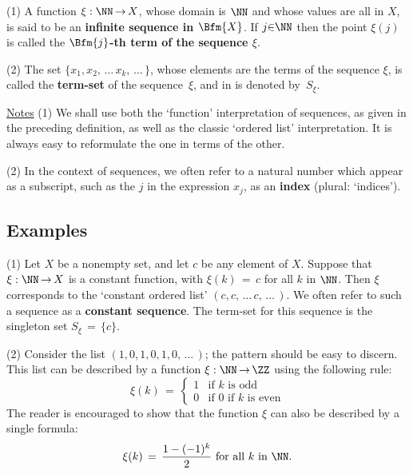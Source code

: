         (1) A function ${\xi}:{\NN} \,{\rightarrow}\, X$, whose domain is ${\NN}$ and whose values are all in $X$,
    is said to be an {\bf infinite sequence in $\Bfm{X}$}.
    If $j{\in}{\NN}$ then the point ${\xi}(j)$ is called the {\bf $\Bfm{j}$-th term of the sequence ${\xi}$}.

\V

        (2) The set $\{x_{1}, x_{2},\,{\ldots}\,x_{k},\,{\ldots}\,\}$, whose elements are the terms of the sequence ${\xi}$,
    is called the {\bf term-set} of the sequence~${\xi}$, and in {\ThisText} is denoted by~$S_{{\xi}}$.


\VV

        \underline{Notes} (1) We shall use both the `function' interpretation of sequences, as given in the preceding definition,
    as well as the classic `ordered list' interpretation. It is always easy to reformulate the one in terms of the other.

\V

        (2) In the context of sequences, we often refer to a natural number which appear as a subscript,
    such as the $j$ in the expression $x_{j}$, as an {\bf index} (plural: `indices').

\VV

        \subsection{\small{{\bf Examples}}}
        \label{ExampA40.30}

\hspace*{\parindent}
        (1) Let $X$ be a nonempty set, and let $c$ be any element of $X$. Suppose that ${\xi}:{\NN} \,{\rightarrow}\, X$ is a constant function,
    with ${\xi}(k) \,=\, c$ for all $k$ in ${\NN}$. Then ${\xi}$ corresponds to the `constant ordered list' $(c,c,\,{\ldots}\,c,\,{\ldots}\,)$.
    We often refer to such a sequence as a {\bf constant sequence}.
    The term-set for this sequence is the singleton set $S_{{\xi}} \,=\, \{c\}$.

\V

        (2) Consider the list $(1,0,1,0,1,0,\,{\ldots}\,)$; the pattern should be easy to discern.
    This list can be described by a function ${\xi}:{\NN} \,{\rightarrow}\, {\ZZ}$ using the following rule:
        \begin{displaymath}
        {\xi}(k) \,=\, 
        \left\{
        \begin{array}{ll}
        1 & \mbox{if $k$ is odd} \\
        0 & \mbox{if $0$ if $k$ is even}
        \end{array}
                        \right.
        \end{displaymath}
    The reader is encouraged to show that the function ${\xi}$ can also be described by a single formula:
        \begin{displaymath}
        {\xi}(k) \,=\, \frac{1 - (-1)^{k}}{2} \mbox{ for all $k$ in ${\NN}$}.
        \end{displaymath}

